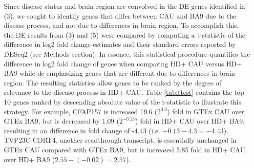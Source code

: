 \documentclass[fleqn,10pt,table]{wlscirep}
\begin{document}
Since disease status and brain region are convolved in the DE genes identified in (3), we sought to identify genes that differ between CAU and BA9 due to the disease process, and not due to differences in brain region.
To accomplish this, the DE results from (3) and (5) were compared by computing a t-statistic of the difference in log2 fold change estimates and their standard errors reported by DESeq2 (see Methods section).
In essence, this statistical procedure quantifies the difference in log2 fold change of genes when comparing HD+ CAU versus HD+ BA9 while de-emphasizing genes that are different due to differences in brain region.
The resulting statistics allow genes to be ranked by the degree of relevance to the disease process in HD+ CAU.
Table \ref{tab:ttest} contains the top 10 genes ranked by descending absolute value of the t-statistic to illustrate this strategy.
For example, CFAP157 is increased 19.6 ($2^{4.3}$) fold in GTEx CAU over GTEx BA9, but is decreased by 1.09 ($2^{-0.13}$) fold in HD+ CAU over HD+ BA9, resulting in an difference in fold change of -4.43 (i.e. $-0.13 -4.3 = -4.43$).
TVP23C-CDRT4, another readthrough transcript, is essentially unchanged in GTEx CAU compared with GTEx BA9, but is increased 5.85 fold in HD+ CAU over HD+ BA9 ($2.55 -(-0.02)=2.57$).
\end{document}
